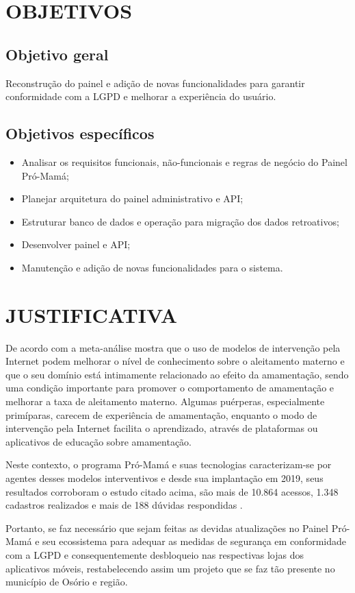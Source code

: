 \section{OBJETIVOS}

\subsection{Objetivo geral}

Reconstrução do painel e adição de novas funcionalidades para garantir conformidade com a LGPD e melhorar a experiência do usuário.

\subsection{Objetivos específicos}

\begin{itemize}
  \item Analisar os requisitos funcionais, não-funcionais e regras de negócio do Painel Pró-Mamá;
  \item Planejar arquitetura do painel administrativo e API;
  \item Estruturar banco de dados e operação para migração dos dados retroativos;
  \item Desenvolver painel e API;
  \item Manutenção e adição de novas funcionalidades para o sistema.
\end{itemize}

\section{JUSTIFICATIVA}

De acordo com  a meta-análise mostra que o uso de modelos de intervenção pela Internet podem melhorar o nível de conhecimento sobre o aleitamento materno e que o seu domínio está intimamente relacionado ao efeito da amamentação, sendo uma condição importante para promover o comportamento de amamentação e melhorar a taxa de aleitamento materno. Algumas puérperas, especialmente primíparas, carecem de experiência de amamentação, enquanto o modo de intervenção pela Internet facilita o aprendizado, através de plataformas ou aplicativos de educação sobre amamentação.

Neste contexto, o programa Pró-Mamá e suas tecnologias caracterizam-se por agentes desses modelos interventivos e desde sua implantação em 2019, seus resultados corroboram o estudo citado acima, são mais de 10.864 acessos, 1.348 cadastros realizados e mais de 188 dúvidas respondidas .

Portanto, se faz necessário que sejam feitas as devidas atualizações no Painel Pró-Mamá e seu ecossistema para adequar as medidas de segurança em conformidade com a LGPD e consequentemente desbloqueio nas respectivas lojas dos aplicativos móveis, restabelecendo assim um projeto que se faz tão presente no município de Osório e região.
